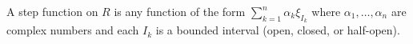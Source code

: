 A step function on $R$ is any function of the form $\sum_{k=1}^{n} \alpha_k \xi_{I_k}$ where $\alpha_1, \ldots, \alpha_n$ are complex numbers and each $I_k$ is a bounded interval (open, closed, or half-open).
